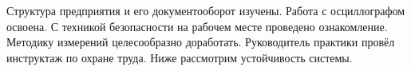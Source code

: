 Структура предприятия и его документооборот изучены.
Работа с осциллографом освоена.
С техникой безопасности на рабочем месте проведено ознакомление.
Методику измерений целесообразно доработать.
Руководитель практики провёл инструктаж по охране труда.
Ниже рассмотрим устойчивость системы.
